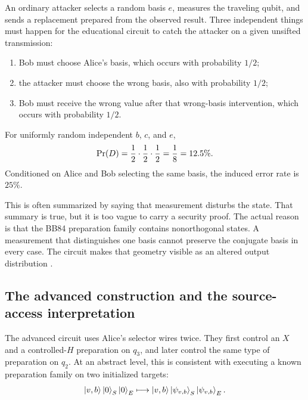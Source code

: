 An ordinary attacker selects a random basis $e$, measures the traveling qubit,
and sends a replacement prepared from the observed result. Three independent
things must happen for the educational circuit to catch the attacker on a
given unsifted transmission:

\begin{enumerate}
  \item Bob must choose Alice's basis, which occurs with probability $1/2$;
  \item the attacker must choose the wrong basis, also with probability $1/2$;
  \item Bob must receive the wrong value after that wrong-basis intervention,
  which occurs with probability $1/2$.
\end{enumerate}

\begin{proposition}
For uniformly random independent $b$, $c$, and $e$,
\begin{equation}
  \operatorname{Pr}(D)=\frac12\cdot\frac12\cdot\frac12
  =\frac18=12.5\%.
  \label{eq:caseii-detection-probability}
\end{equation}
Conditioned on Alice and Bob selecting the same basis, the induced error rate is
$25\%$.
\end{proposition}

This is often summarized by saying that measurement disturbs the state. That
summary is true, but it is too vague to carry a security proof. The actual
reason is that the BB84 preparation family contains nonorthogonal states. A
measurement that distinguishes one basis cannot preserve the conjugate basis in
every case. The circuit makes that geometry visible as an altered output
distribution \cite{fuchs1996information}.

\subsection{The advanced construction and the source-access interpretation}

The advanced circuit uses Alice's selector wires twice. They first control an
$X$ and a controlled-$H$ preparation on $q_3$, and later control the same type
of preparation on $q_2$. At an abstract level, this is consistent with
executing a known preparation family on two initialized targets:
\begin{equation}
  \ket{v,b}\ket{0}_S\ket{0}_E
  \longmapsto
  \ket{v,b}\ket{\psi_{v,b}}_S\ket{\psi_{v,b}}_E.
  \label{eq:caseii-prepare-twice}
\end{equation}

